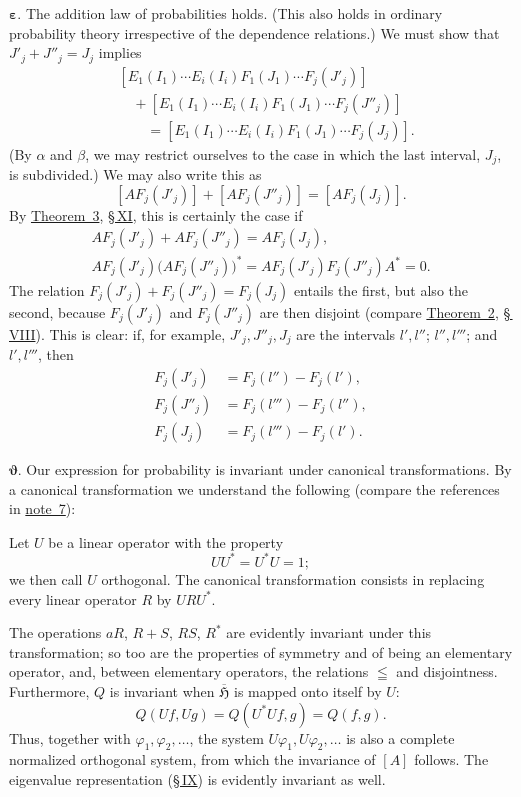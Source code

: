 \documentclass[fontsize=13pt,paper=b5,twoside,bookmarkpackage=false]{scrartcl}
\newcommand{\Sec}[1]{\hyperref[sec:#1]{\S\,#1}}
\newcommand{\fnref}[1]{\hyperref[fn:#1]{note~#1}}
\begin{document}
\par\medskip\noindent$\boldsymbol{\varepsilon.}$ The addition law of probabilities holds. (This also holds in ordinary probability theory irrespective of the dependence relations.) We must show that $J'_j+J''_j=J_j$ implies
\begin{align*}
 &[E_1(I_1)\cdots E_i(I_i)F_1(J_1)\cdots F_j(J'_j)]\\
 &\quad+[E_1(I_1)\cdots E_i(I_i)F_1(J_1)\cdots F_j(J''_j)]\\
 &\qquad=[E_1(I_1)\cdots E_i(I_i)F_1(J_1)\cdots F_j(J_j)].
\end{align*}
(By $\alpha$ and $\beta$, we may restrict ourselves to the case in which the last interval, $J_j$, is subdivided.) We may also write this as
\[
 [AF_j(J'_j)]+[AF_j(J''_j)]=[AF_j(J_j)].
\]
By \hyperref[thm:XI:3]{Theorem~3}, \Sec{XI}, this is certainly the case if
\begin{gather*}
 AF_j(J'_j)+AF_j(J''_j)=AF_j(J_j),\\
 AF_j(J'_j)\bigl(AF_j(J''_j)\bigr)^*
 =AF_j(J'_j)F_j(J''_j)A^*=0.
\end{gather*}
The relation $F_j(J'_j)+F_j(J''_j)=F_j(J_j)$ entails the first, but also the second, because $F_j(J'_j)$ and $F_j(J''_j)$ are then disjoint (compare \hyperref[thm:VIII:2]{Theorem~2}, \Sec{VIII}). This is clear: if, for example, $J'_j,J''_j,J_j$ are the intervals $l',l''$; $l'',l'''$; and $l',l'''$, then
\begin{align*}
 F_j(J'_j)&=F_j(l'')-F_j(l'),\\
 F_j(J''_j)&=F_j(l''')-F_j(l''),\\
 F_j(J_j)&=F_j(l''')-F_j(l').
\end{align*}

\par\medskip\noindent$\boldsymbol{\vartheta.}$ Our expression for probability is invariant under canonical transformations. By a canonical transformation we understand the following (compare the references in \fnref{7}):

Let $U$ be a linear operator with the property
\[
 UU^*=U^*U=1;
\]
we then call $U$ orthogonal. The canonical transformation consists in replacing every linear operator $R$ by $URU^*$.

The operations $aR$, $R+S$, $RS$, $R^*$ are evidently invariant under this transformation; so too are the properties of symmetry and of being an elementary operator, and, between elementary operators, the relations $\leqq$ and disjointness. Furthermore, $Q$ is invariant when $\overline{\mathfrak{H}}$ is mapped onto itself by $U$:
\[
 Q(Uf,Ug)=Q(U^*Uf,g)=Q(f,g).
\]
Thus, together with $\varphi_1,\varphi_2,\ldots$, the system $U\varphi_1,U\varphi_2,\ldots$ is also a complete normalized orthogonal system, from which the invariance of $[A]$ follows. The eigenvalue representation (\Sec{IX}) is evidently invariant as well.
\end{document}
